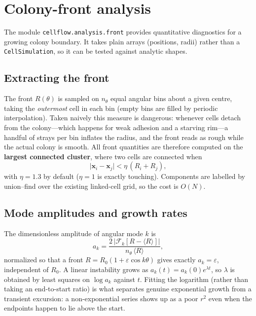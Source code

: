 \documentclass[11pt]{article}
\newcommand{\vx}{\bm{x}}
\begin{document}
\section{Colony-front analysis}\label{sec:front}

The module \texttt{cellflow.analysis.front} provides quantitative diagnostics for
a growing colony boundary. It takes plain arrays (positions, radii) rather than a
\texttt{CellSimulation}, so it can be tested against analytic shapes.

\subsection{Extracting the front}
The front $R(\theta)$ is sampled on $n_\theta$ equal angular bins about a given
centre, taking the \emph{outermost} cell in each bin (empty bins are filled by
periodic interpolation). Taken naively this measure is dangerous: whenever cells
detach from the colony---which happens for weak adhesion and a starving rim---a
handful of strays per bin inflates the radius, and the front reads as rough while
the actual colony is smooth. All front quantities are therefore computed on the
\textbf{largest connected cluster}, where two cells are connected when
\begin{equation}
  \lvert \vx_i - \vx_j\rvert < \eta\,(R_i + R_j),
\end{equation}
with $\eta=1.3$ by default ($\eta=1$ is exactly touching). Components are labelled
by union--find over the existing linked-cell grid, so the cost is $O(N)$.

\subsection{Mode amplitudes and growth rates}
The dimensionless amplitude of angular mode $k$ is
\begin{equation}
  a_k = \frac{2\,\lvert \mathcal{F}_k[R - \langle R\rangle]\rvert}
             {n_\theta\,\langle R\rangle},
\end{equation}
normalized so that a front $R=R_0(1+\varepsilon\cos k\theta)$ gives exactly
$a_k=\varepsilon$, independent of $R_0$. A linear instability grows as
$a_k(t)=a_k(0)e^{\lambda t}$, so $\lambda$ is obtained by least squares on
$\log a_k$ against $t$. Fitting the logarithm (rather than taking an
end-to-start ratio) is what separates genuine exponential growth from a transient
excursion: a non-exponential series shows up as a poor $r^2$ even when the
endpoints happen to lie above the start.
\end{document}
